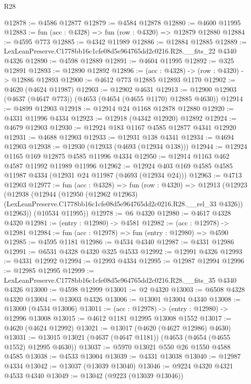 \begin{lexlean}{R28}
\begin{coremodule}
@12878 := @4586 @12877
@12879 := @4584 @12878
@12880 := @4600 @11995
@12883 := fun (acc : @4328) => fun (row : @4320) => @12879 @12880
@12884 := @4595 @773
@12885 := @4342 @11989
@12886 := @12884 @12885
@12889 := LexLeanPreserve.C1778bb16c1cfe08d5e964765dd2c0216.R28.__fits_22 @4340 @4326
@12890 := @4598 @12889
@12891 := @4604 @11995
@12892 := @325 @12891
@12893 := @12890 @12892
@12896 := (acc : @4328) -> (row : @4320) -> @12886 @12893
@12900 := @4612 @773 @12885 @12893 @1170
@12902 := @4620 (@4624 @11987)
@12903 := @12902 @4631
@12913 := @12900 @12903 (@4637 (@4647 @773)) (@4653 (@4654 (@4655 @1170) @12885 @4630))
@12914 := @4899 @12903
@12918 := @12914 @24 @1168 @12878 @12880
@12920 := @4331 @11996 @4334
@12923 := @12918 (@4342 @12920) @12892
@12924 := @4679 @12903
@12930 := @12924 @183 @1167 @4585 @12877 @4341 @12920
@12931 := @4688 @12903
@12933 := @12931 @138 @4341
@12934 := @4694 @12903
@12938 := @12930 (@12933 (@4693 (@12934 @138)))
@12944 := @12924 @1165 @169 @12875 @4585 @11996 @4334
@12950 := @12914 @1163 @462 @4587 @11992 @11989 @11996
@12962 := @12924 @403 @169 @4585 @4585 @11987 @4334 (@12931 @24 @11987 (@4693 (@12934 @24)))
@12963 := @4713 @12903
@12977 := fun (acc : @4328) =>
  fun (row : @4320) =>
  @12913
    (@12923
      (@12938
        (@12944
          (@12950
            (@12962 @12963)
            (LexLeanPreserve.C1778bb16c1cfe08d5e964765dd2c0216.R28.__rel_33 @4326))
          @12963))
      (@10534 @11995))
@12978 := @6 @4320
@12980 := @4617 @4328 @4320
@12981 := (entry : @12980) -> @4581
@12982 := (acc : @12978) -> @12981
@12984 := fun (acc : @12978) => fun (entry : @12980) => @4590
@12985 := @4595 @1181
@12986 := @4534 @4340
@12987 := @4331 @12986
@12991 := @6531 @4328 @4320 @325 @4533
@12992 := @12991 @4326
@12993 := @4331 @12992
@12994 := @12993 @4334
@12995 := @12987 @12994
@12996 := @12985 @12995
@12999 := LexLeanPreserve.C1778bb16c1cfe08d5e964765dd2c0216.R28.__fits_35 @4340 @4326
@13000 := @4598 @12999
@13001 := @2 @4320
@13003 := @6508 @4328 @4320
@13004 := @13003 @4326
@13006 := @13001 @13004 @4340
@13008 := @13000 (@4534 @13006)
@13011 := (acc : @12978) -> (entry : @12980) -> @12996 @13008
@13015 := @4612 @1181 @12995 @13008 @1552
@13017 := @4620 (@4624 @12992)
@13021 := @13017 (@4620 (@4627 @12986) @4630)
@13031 := @13015 @13021 (@4637 (@4647 @1181)) (@4653 (@4654 (@4655 @1552) @12995 @4630))
@13037 := @5970 @13021 @550 @26 @1550 @4588 @4585
@13038 := @4533 @13004
@13039 := @4331 @13038
@13040 := @12987 @4334
@13042 := @13037 (@13039 @13040)
@13046 := @9224 @4320 @4321 @4533 @4340
@13049 := @13042 (@9223 (@13039 @13046))

\end{coremodule}
\end{lexlean}
